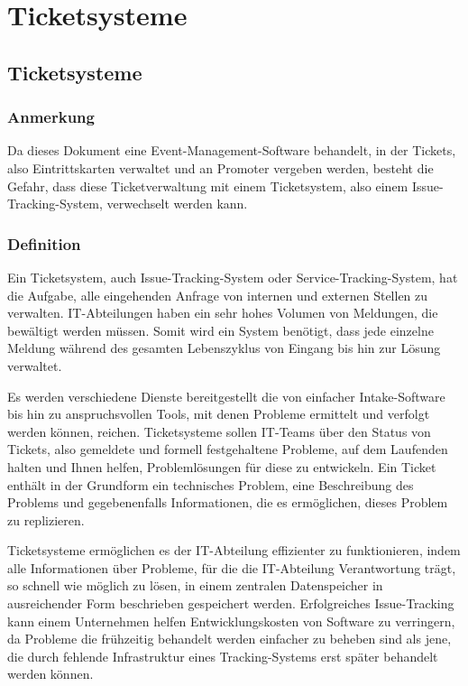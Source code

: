 \chapter{Ticketsysteme}
\reiter
\section{Ticketsysteme}
\subsection{Anmerkung}
Da dieses Dokument eine Event-Management-Software behandelt, in der Tickets, also Eintrittskarten verwaltet und an Promoter vergeben werden, besteht die Gefahr, dass diese Ticketverwaltung mit einem Ticketsystem, also einem Issue-Tracking-System, verwechselt werden kann.  
  
\subsection{Definition}
Ein Ticketsystem, auch Issue-Tracking-System oder Service-Tracking-System, hat die Aufgabe, alle eingehenden Anfrage von internen und externen Stellen zu verwalten. IT-Abteilungen haben ein sehr hohes Volumen von Meldungen, die bewältigt werden müssen. Somit wird ein System benötigt, dass jede einzelne Meldung während des gesamten Lebenszyklus von Eingang bis hin zur Lösung verwaltet.

Es werden verschiedene Dienste bereitgestellt die von einfacher Intake-Software bis hin zu anspruchsvollen Tools, mit denen Probleme ermittelt und verfolgt werden können, reichen.
Ticketsysteme sollen IT-Teams über den Status von Tickets, also gemeldete und formell festgehaltene Probleme, auf dem Laufenden halten und Ihnen helfen, Problemlösungen für diese zu entwickeln. 
Ein Ticket enthält in der Grundform ein technisches Problem, eine Beschreibung des Problems und gegebenenfalls Informationen, die es ermöglichen, dieses Problem zu replizieren.

Ticketsysteme ermöglichen es der IT-Abteilung effizienter zu funktionieren, indem alle Informationen über Probleme, für die die IT-Abteilung Verantwortung trägt, so schnell wie möglich zu lösen, in einem zentralen Datenspeicher in ausreichender Form beschrieben gespeichert werden.
Erfolgreiches Issue-Tracking kann einem Unternehmen helfen Entwicklungskosten von Software zu verringern, da Probleme die frühzeitig behandelt werden einfacher zu beheben sind als jene, die durch fehlende Infrastruktur eines Tracking-Systems erst später behandelt werden können.
